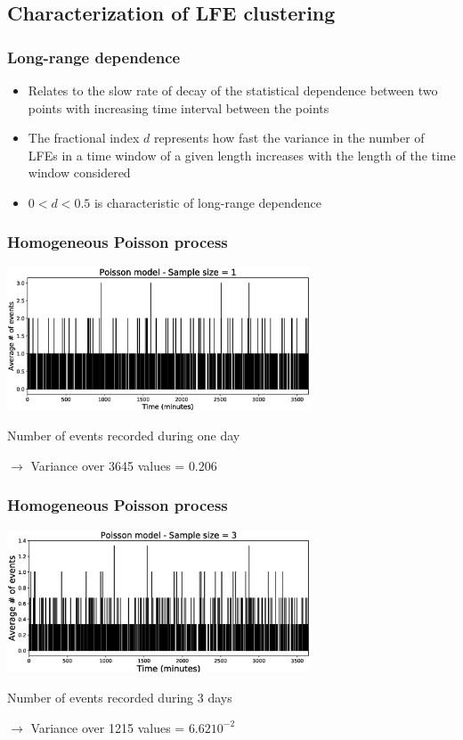 \documentclass{beamer}
\begin{document}

	\subsection{Characterization of LFE clustering}

	\begin{frame}
		\frametitle{Long-range dependence}
		\begin{itemize}
			\item Relates to the slow rate of decay of the statistical dependence between two points with increasing time interval between the points
			\item The fractional index $d$ represents how fast the variance in the number of LFEs in a time window of a given length increases with the length of the time window considered
			\item $0 < d < 0.5$ is characteristic of long-range dependence
		\end{itemize}
	\end{frame}

	\begin{frame}
		\frametitle{Homogeneous Poisson process}
		\begin{center}
			\includegraphics[width=9cm, trim={1cm 0cm 3cm 0cm}, clip]{longrange/Poisson_1.eps}
		\end{center}
		Number of events recorded during one day

		$\rightarrow$ Variance over 3645 values = $0.206$
	\end{frame}

	\begin{frame}
		\frametitle{Homogeneous Poisson process}
		\begin{center}
			\includegraphics[width=9cm, trim={1cm 0cm 3cm 0cm}, clip]{longrange/Poisson_2.eps}
		\end{center}
		Number of events recorded during 3 days

		$\rightarrow$ Variance over 1215 values = $6.62 10^{-2}$
	\end{frame}
\end{document}
